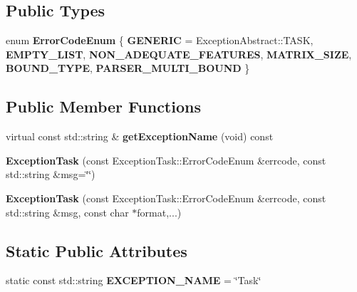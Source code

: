 \subsection*{Public Types}
\begin{DoxyCompactItemize}
\item 
\mbox{\label{classdynamic__graph_1_1ExceptionTask_a0ccd75121639190d176ffd062e0d69d8}} 
enum {\bfseries Error\+Code\+Enum} \{ \newline
{\bfseries G\+E\+N\+E\+R\+IC} = Exception\+Abstract\+:\+:T\+A\+SK, 
{\bfseries E\+M\+P\+T\+Y\+\_\+\+L\+I\+ST}, 
{\bfseries N\+O\+N\+\_\+\+A\+D\+E\+Q\+U\+A\+T\+E\+\_\+\+F\+E\+A\+T\+U\+R\+ES}, 
{\bfseries M\+A\+T\+R\+I\+X\+\_\+\+S\+I\+ZE}, 
\newline
{\bfseries B\+O\+U\+N\+D\+\_\+\+T\+Y\+PE}, 
{\bfseries P\+A\+R\+S\+E\+R\+\_\+\+M\+U\+L\+T\+I\+\_\+\+B\+O\+U\+ND}
 \}
\end{DoxyCompactItemize}
\subsection*{Public Member Functions}
\begin{DoxyCompactItemize}
\item 
\mbox{\label{classdynamic__graph_1_1ExceptionTask_ad6753327342abdb80c12ae7d9c846c1f}} 
virtual const std\+::string \& {\bfseries get\+Exception\+Name} (void) const
\item 
\mbox{\label{classdynamic__graph_1_1ExceptionTask_af05ac9817dc1de874190803ed92321a8}} 
{\bfseries Exception\+Task} (const Exception\+Task\+::\+Error\+Code\+Enum \&errcode, const std\+::string \&msg=\char`\"{}\char`\"{})
\item 
\mbox{\label{classdynamic__graph_1_1ExceptionTask_ac9bd1b490d5758bf1c7eecaeee6cebe9}} 
{\bfseries Exception\+Task} (const Exception\+Task\+::\+Error\+Code\+Enum \&errcode, const std\+::string \&msg, const char $\ast$format,...)
\end{DoxyCompactItemize}
\subsection*{Static Public Attributes}
\begin{DoxyCompactItemize}
\item 
\mbox{\label{classdynamic__graph_1_1ExceptionTask_ad36eb4b540be350af2b24895955dcc0a}} 
static const std\+::string {\bfseries E\+X\+C\+E\+P\+T\+I\+O\+N\+\_\+\+N\+A\+ME} = \char`\"{}Task\char`\"{}
\end{DoxyCompactItemize}
